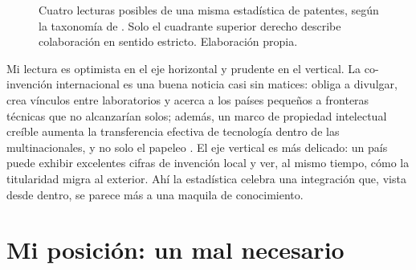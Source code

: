 \documentclass[11pt,letterpaper]{article}
\begin{document}
\begin{figure}[ht]
  \centering
  \caption{Cuatro lecturas posibles de una misma estadística de patentes, según
  la taxonomía de \textcite{archibugi1995}. Solo el cuadrante superior derecho
  describe colaboración en sentido estricto. Elaboración propia.}
  \label{fig:cuadrantes}
\end{figure}

Mi lectura es optimista en el eje horizontal y prudente en el vertical. La
co-invención internacional es una buena noticia casi sin matices: obliga a
divulgar, crea vínculos entre laboratorios y acerca a los países pequeños a
fronteras técnicas que no alcanzarían solos; además, un marco de propiedad
intelectual creíble aumenta la transferencia efectiva de tecnología dentro de
las multinacionales, y no solo el papeleo \parencite{branstetter2006}. El eje
vertical es más delicado: un país puede exhibir excelentes cifras de invención
local y ver, al mismo tiempo, cómo la titularidad migra al exterior. Ahí la
estadística celebra una integración que, vista desde dentro, se parece más a una
maquila de conocimiento.

\section*{Mi posición: un mal necesario}
\end{document}

